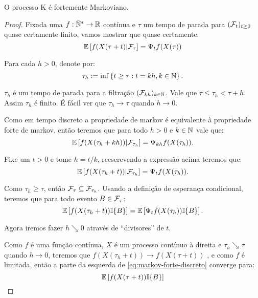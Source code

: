 \begin{proposicao}
  \label{prop:markov-forte}
  O processo K é fortemente Markoviano.
\end{proposicao}
\begin{proof}
  Fixada uma $f: {\mathbb{\bar{N}^*}} \to {\mathbb{R}}$ contínua e $\tau$ um tempo de parada
  para $({\mathcal{F}}_t)_{t \geq 0}$ quase certamente finito, vamos mostrar que
  quase certamente:
  \begin{equation}
    \label{eq:markov-forte}
    {\mathbb{E}} \left[ f(X(\tau + t) \middle| {\mathcal{F}}_\tau \right]
    = \Psi_t f (X(\tau))
  \end{equation}

  Para cada $h > 0$, denote por: 
  \begin{displaymath}
    \tau_h := \inf\left\{
      t \geq \tau: t = k h, k \in {\mathbb{N}}
    \right\}.
  \end{displaymath}

  $\tau_h$ é um tempo de parada para a filtração $({\mathcal{F}}_{k h})_{k \in
    {\mathbb{N}}}$. Vale que $\tau \leq \tau_h < \tau + h$. Assim $\tau_h$ é \qc
  finito. É fácil ver que $\tau_h \to \tau$ \qc quando $h \to 0$.

  Como em tempo discreto a propriedade de markov é equivalente à
  propriedade forte de markov, então teremos que para todo $h > 0$ e
  $k \in {\mathbb{N}}$ vale que:
 \begin{displaymath}
    {\mathbb{E}} \left[ f(X(\tau_h + k h)) \middle| {\mathcal{F}}_{\tau_h} \right]
    = \Psi_{k h} f (X(\tau_h)).
  \end{displaymath}
  
  Fixe um $t > 0$ e tome $h = t/k$, reescrevendo a expressão acima
  teremos que:
  \begin{displaymath}
    {\mathbb{E}} \left[ f(X(\tau_h + t)) \middle| {\mathcal{F}}_{\tau_h} \right]
    = \Psi_t f (X(\tau_h)).
  \end{displaymath}

  Como $\tau_h \geq \tau$, então ${\mathcal{F}}_{\tau} \subseteq {\mathcal{F}}_{\tau_h}$.
  Usando a definição de esperança condicional, teremos que para todo
  evento $B \in {\mathcal{F}}_{\tau}$:
  \begin{equation}
    \label{eq:markov-forte-discreto}
    {\mathbb{E}} \left[ f(X(\tau_h + t)) {\mathbb{I}}\{B\} \right]
    = {\mathbb{E}} \left[ \Psi_t f (X(\tau_h)) {\mathbb{I}}\{B\} \right].
  \end{equation}

  Agora iremos fazer $h \searrow 0$ através de ``divisores'' de $t$.

  Como $f$ é uma função contínua, $X$ é um processo contínuo à direita
  e $\tau_h \searrow \tau$ quando $h \to 0$, teremos que $f(X(\tau_h + t))
  \to f(X(\tau + t))$ \qc, e como $f$ é limitada, então a parte da
  esquerda de \eqref{eq:markov-forte-discreto} converge para:
  \begin{displaymath}
    {\mathbb{E}} \left[ f(X(\tau + t)) {\mathbb{I}}\{B\} \right]
  \end{displaymath}


\end{proof}

